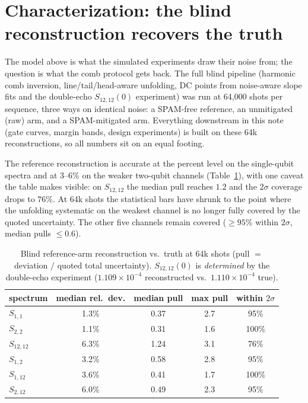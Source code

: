 \documentclass[10pt]{article}
\begin{document}
\section{Characterization: the blind reconstruction recovers the truth}\label{sec:char}

The model above is what the simulated experiments draw their noise from; the
question is what the comb protocol gets back. The full blind pipeline
(harmonic comb inversion, line/tail/head-aware unfolding, DC points from
noise-aware slope fits and the double-echo $S_{12,12}(0)$ experiment) was
run at 64{,}000 shots per sequence, three ways on identical noise: a
SPAM-free reference, an unmitigated (raw) arm, and a SPAM-mitigated arm.
Everything downstream in this note (gate curves, margin bands, design
experiments) is built on these 64k reconstructions, so all numbers sit on
an equal footing.

The reference reconstruction is accurate at the percent level on the
single-qubit spectra and at 3--6\% on the weaker two-qubit channels
(Table~\ref{tab:recon}), with one caveat the table makes visible: on
$S_{12,12}$ the median pull reaches $1.2$ and the $2\sigma$ coverage drops
to $76\%$. At 64k shots the statistical bars have shrunk to the point where
the unfolding systematic on the weakest channel is no longer fully covered
by the quoted uncertainty. The other five channels remain covered
($\geq 95\%$ within $2\sigma$, median pulls $\leq 0.6$).

\begin{table}[h!]
\centering\small
\begin{tabular}{lcccc}
\toprule
spectrum & median rel.\ dev. & median pull & max pull & within $2\sigma$ \\
\midrule
$S_{1,1}$    & 1.3\% & 0.37 & 2.7 & 95\% \\
$S_{2,2}$    & 1.1\% & 0.31 & 1.6 & 100\% \\
$S_{12,12}$  & 6.3\% & 1.24 & 3.1 & 76\% \\
$S_{1,2}$    & 3.2\% & 0.58 & 2.8 & 95\% \\
$S_{1,12}$   & 3.6\% & 0.41 & 1.7 & 100\% \\
$S_{2,12}$   & 6.0\% & 0.49 & 2.3 & 95\% \\
\bottomrule
\end{tabular}
\caption{Blind reference-arm reconstruction vs.\ truth at 64k shots (pull
$=$ deviation $/$ quoted total uncertainty). $S_{12,12}(0)$ is
\emph{determined} by the double-echo experiment ($1.109\times10^{-4}$
reconstructed vs.\ $1.110\times10^{-4}$ true).}
\label{tab:recon}
\end{table}
\end{document}
